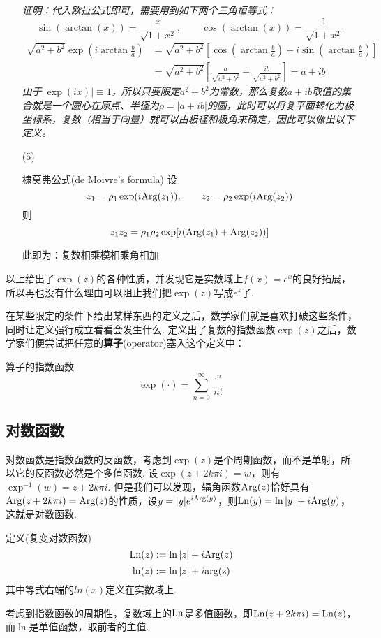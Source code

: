 \documentclass[main.tex]{subfiles}
\begin{document}
\begin{itemize}
    \textit{
        证明：代入欧拉公式即可，需要用到如下两个三角恒等式：
        \[\sin(\arctan(x))=\frac{x}{\sqrt{1+x^2}},\qquad \cos(\arctan(x))=\frac{1}{\sqrt{1+x^2}}\]
    }
    \begin{align*}
        \sqrt{a^2+b^2}\exp\left(i\arctan\frac{b}{a}\right) &= 
        \sqrt{a^2+b^2}\left[\cos\left(\arctan\frac{b}{a}\right)+i\sin\left(\arctan\frac{b}{a}\right)\right] \\
        &=\sqrt{a^2+b^2}\left[\frac{a}{\sqrt{a^2+b^2}}+\frac{ib}{\sqrt{a^2+b^2}}\right] = a+ib
    \end{align*}
    \textit{
        由于\(|\exp(ix)|\equiv 1\)，所以只要限定\(a^2+b^2\)为常数，那么复数\(a+ib\)取值的集合就是一个圆心在原点、半径为\(\rho=|a+ib|\)的圆，此时可以将复平面转化为极坐标系，复数（相当于向量）就可以由极径和极角来确定，因此可以做出以下定义。
    }
    \item[(5)]
    \begin{theorem}{棣莫弗公式(de Moivre's formula)}
        设
        \[z_1=\rho_1\exp(i{\rm Arg}(z_1)), \qquad z_2=\rho_2\exp(i{\rm Arg}(z_2))\]
        则
        \[z_1z_2=\rho_1\rho_2\exp[i({\rm Arg}(z_1)+{\rm Arg}(z_2))]\]
    \end{theorem}
    此即为：复数相乘模相乘角相加
\end{itemize}

以上给出了\(\exp(z)\)的各种性质，并发现它是实数域上\(f(x)=e^x\)的良好拓展，所以再也没有什么理由可以阻止我们把\(\exp(z)\)写成\(e^z\)了.

\vspace{1cm}

在某些限定的条件下给出某样东西的定义之后，数学家们就是喜欢打破这些条件，同时让定义强行成立看看会发生什么. 定义出了复数的指数函数\(\exp(z)\)之后，数学家们便尝试把任意的\textbf{算子}(operator)塞入这个定义中：
\begin{definition}{算子的指数函数}
    \[\exp(\cdot) = \sum_{n=0}^{\infty}\frac{\cdot^n}{n!}\]
\end{definition}

\subsection{对数函数}

对数函数是指数函数的反函数，考虑到\(\exp(z)\)是个周期函数，而不是单射，所以它的反函数必然是个多值函数. 设\(\exp(z+2k\pi i)=w\)，则有\(\exp^{-1}(w)=z+2k\pi i\). 但是我们可以发现，辐角函数\({\rm Arg}(z)\)恰好具有\({\rm Arg}(z+2k\pi i)={\rm Arg}(z)\)的性质，设\(y=|y|e^{i{\rm Arg}(y)}\)，则\({\rm Ln}(y)=\ln|y|+i{\rm Arg}(y)\)，这就是对数函数.
\begin{definition}{定义(复变对数函数)}
    \[{\rm Ln}(z):=\ln|z|+i{\rm Arg}(z)\]
    \[\ln(z):=\ln|z|+i{\rm arg(z)}\]
    其中等式右端的\(ln(x)\)定义在实数域上.
\end{definition}
考虑到指数函数的周期性，复数域上的\({\rm Ln}\)是多值函数，即\({\rm Ln}(z+2k\pi i)={\rm Ln}(z)\)，而\(\ln\)是单值函数，取前者的主值.
\end{document}
